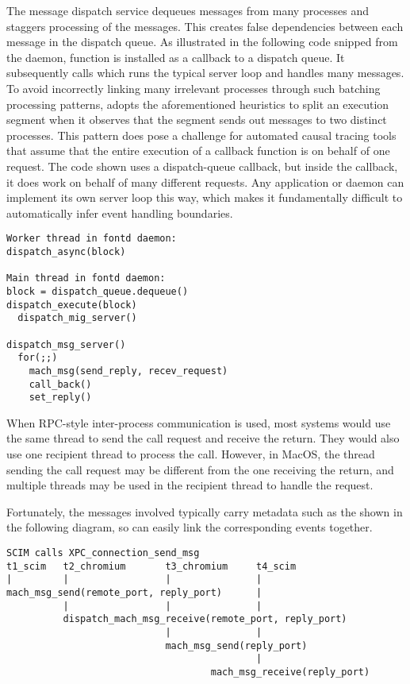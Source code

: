 The message dispatch service dequeues messages from many processes and staggers
processing of the messages. This creates false dependencies between each
message in the dispatch queue.  As illustrated in the following code snipped
from the  daemon, function  is installed as a
callback to a dispatch queue.  It subsequently calls
 which runs the typical server loop and handles many
messages.
To avoid incorrectly linking many irrelevant processes through such
batching processing patterns, \xxx adopts the aforementioned heuristics to
split an execution segment when it observes that the segment sends out messages
to two distinct processes.
This pattern does pose a challenge for automated causal tracing tools that
assume that the entire execution of a callback function is on behalf of one
request.  The code shown uses a dispatch-queue callback, but inside the
callback, it does work on behalf of many different requests.  Any application
or daemon can implement its  own server loop this way, which makes it
fundamentally difficult to automatically infer event handling boundaries.

{\footnotesize \begin{verbatim}
Worker thread in fontd daemon:
dispatch_async(block)

Main thread in fontd daemon:
block = dispatch_queue.dequeue()
dispatch_execute(block)
  dispatch_mig_server()

dispatch_msg_server()
  for(;;)
    mach_msg(send_reply, recev_request)
    call_back()
    set_reply()
\end{verbatim}
}

When RPC-style inter-process communication is used, most systems would use the
same thread to send the call request and receive the return.  They would also
use one recipient thread to process the call.  However, in MacOS, the thread
sending the call request may be different from the one receiving the return,
and multiple threads may be used in the recipient thread to handle the request.

Fortunately, the messages involved typically carry metadata such as the
 shown in the following diagram, so \xxx can easily link the
corresponding events together.

{\footnotesize \begin{verbatim}
SCIM calls XPC_connection_send_msg
t1_scim   t2_chromium       t3_chromium     t4_scim
|         |                 |               |
mach_msg_send(remote_port, reply_port)      |
          |                 |               |
          dispatch_mach_msg_receive(remote_port, reply_port)
                            |               |
                            mach_msg_send(reply_port)
                                            |
                                    mach_msg_receive(reply_port)

\end{verbatim}
}

